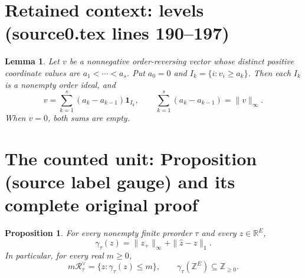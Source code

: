 \documentclass[10pt,a4paper]{amsart}
\newcommand{\Rpoly}[1]{\mathcal R_{#1}^{\vee}}
\theoremstyle{plain}
\newtheorem{lemma}[theorem]{Lemma}
\newtheorem{proposition}[theorem]{Proposition}
\theoremstyle{definition}
\theoremstyle{remark}
\theoremstyle{definition}
\begin{document}
\section*{Retained context: levels (source0.tex lines 190--197)}

\begin{lemma}\label{levels}
Let $v$ be a nonnegative order-reversing vector whose distinct positive coordinate values are $a_1<\cdots<a_s$. Put $a_0=0$ and $I_k=\{i:v_i\ge a_k\}$. Then each $I_k$ is a nonempty order ideal, and
\begin{equation}\label{leveldecomposition}
 v=\sum_{k=1}^s(a_k-a_{k-1})\mathbf1_{I_k},
 \qquad \sum_{k=1}^s(a_k-a_{k-1})=\|v\|_\infty.
\end{equation}
When $v=0$, both sums are empty.
\end{lemma}


\section{The counted unit: Proposition (source label gauge) and its complete original proof}

\begin{proposition}\label{gauge}
For every nonempty finite preorder $\tau$ and every $z\in\mathbb R^E$,
\begin{equation}\label{gdef}
 \gamma_\tau(z)=\|z_+\|_\infty+\|\widehat z-z\|_1.
\end{equation}
In particular, for every real $m\ge0$,
\begin{equation}\label{sublevel}
 m\Rpoly{\tau}=\{z:\gamma_\tau(z)\le m\},
 \qquad \gamma_\tau(\mathbb Z^E)\subseteq\mathbb Z_{\ge0}.
\end{equation}
\end{proposition}
\end{document}
